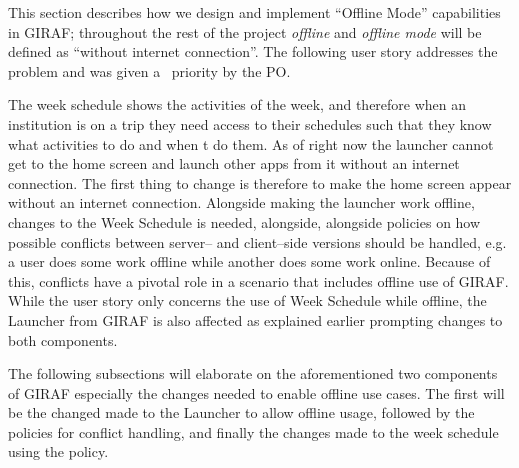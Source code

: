 This section describes how we design and implement \enquote{Offline Mode} capabilities in GIRAF; throughout the rest of the project \textit{offline} and \textit{offline mode} will be defined as \enquote{without internet connection}.
The following user story addresses the problem and was given a \phigh~priority by the PO.

\begin{center}
\end{center}
The week schedule shows the activities of the week, and therefore when an institution is on a trip they need access to their schedules such that they know what activities to do and when t do them.
As of right now the launcher cannot get to the home screen and launch other apps from it without an internet connection.
The first thing to change is therefore to make the home screen appear without an internet connection.
Alongside making the launcher work offline, changes to the Week Schedule is needed, alongside, alongside policies on how possible conflicts between server-- and client--side versions should be handled, e.g. a user does some work offline while another does some work online. 
Because of this, conflicts have a pivotal role in a scenario that includes offline use of GIRAF.
While the user story only concerns the use of Week Schedule while offline, the Launcher from GIRAF is also affected  as explained earlier prompting changes to both components.

The following subsections will elaborate on the aforementioned two components of GIRAF especially the changes needed to enable offline use cases.
The first will be the changed made to the Launcher to allow offline usage, followed by the policies for conflict handling, and finally the changes made to the week schedule using the policy.